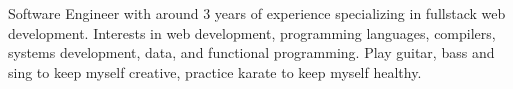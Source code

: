 

\begin{cvparagraph}

Software Engineer with around 3 years of experience specializing in fullstack web development. Interests in web development, programming languages, compilers, systems development, data, and functional programming. Play guitar, bass and sing to keep myself creative, practice karate to keep myself healthy.

\end{cvparagraph}
